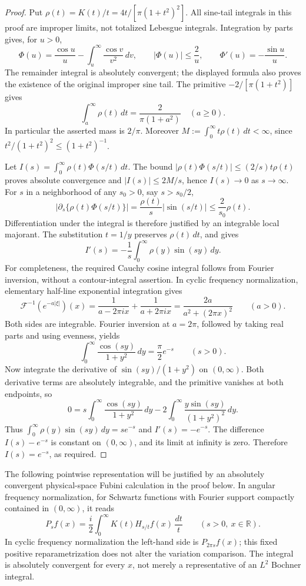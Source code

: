 \documentclass[11pt]{article}
\numberwithin{equation}{section}
\theoremstyle{remark}
\theoremstyle{definition}
\begin{document}
\begin{proof}
Put $\rho(t)=K(t)/t=4t/[\pi(1+t^2)^2]$.  All sine-tail integrals
in this proof are improper limits, not totalized Lebesgue integrals.
Integration by parts gives, for $u>0$,
\[
 \Phi(u)=\frac{\cos u}{u}-\int_u^\infty\frac{\cos v}{v^2}\,dv,
 \qquad |\Phi(u)|\le\frac2u,
 \qquad \Phi'(u)=-\frac{\sin u}{u}.
\]
The remainder integral is absolutely convergent; the displayed formula
also proves the existence of the original improper sine tail.  The
primitive $-2/[\pi(1+t^2)]$ gives
\[
 \int_a^\infty\rho(t)\,dt=\frac{2}{\pi(1+a^2)}\quad(a\ge0).
\]
In particular the asserted mass is $2/\pi$.  Moreover
$M:=\int_0^\infty t\rho(t)\,dt<\infty$, since
$t^2/(1+t^2)^2\le(1+t^2)^{-1}$.

Let $I(s)=\int_0^\infty\rho(t)\Phi(s/t)\,dt$.  The bound
$|\rho(t)\Phi(s/t)|\le(2/s)t\rho(t)$ proves absolute convergence and
$|I(s)|\le2M/s$, hence $I(s)\to0$ as $s\to\infty$.
For $s$ in a neighborhood of any $s_0>0$, say $s>s_0/2$,
\[
 \left|\partial_s\{\rho(t)\Phi(s/t)\}\right|
 =\frac{\rho(t)}s|\sin(s/t)|\le\frac{2}{s_0}\rho(t).
\]
Differentiation under the integral is therefore justified by an
integrable local majorant.  The substitution $t=1/y$ preserves
$\rho(t)\,dt$, and gives
\[
 I'(s)=-\frac1s\int_0^\infty\rho(y)\sin(sy)\,dy.
\]
For completeness, the required Cauchy cosine integral follows from
Fourier inversion, without a contour-integral assertion.  In cyclic
frequency normalization, elementary half-line exponential integration
gives
\[
 \mathcal F^{-1}(e^{-a|\xi|})(x)
 =\frac1{a-2\pi ix}+\frac1{a+2\pi ix}
 =\frac{2a}{a^2+(2\pi x)^2}\qquad(a>0).
\]
Both sides are integrable.  Fourier inversion at $a=2\pi$, followed
by taking real parts and using evenness, yields
\[
 \int_0^\infty\frac{\cos(sy)}{1+y^2}\,dy=\frac\pi2e^{-s}
 \qquad(s>0).
\]
Now integrate the derivative of $\sin(sy)/(1+y^2)$ on $(0,\infty)$.
Both derivative terms are absolutely integrable, and the primitive
vanishes at both endpoints, so
\[
 0=s\int_0^\infty\frac{\cos(sy)}{1+y^2}\,dy
   -2\int_0^\infty\frac{y\sin(sy)}{(1+y^2)^2}\,dy.
\]
Thus $\int_0^\infty\rho(y)\sin(sy)\,dy=se^{-s}$ and
$I'(s)=-e^{-s}$.  The difference $I(s)-e^{-s}$ is constant on
$(0,\infty)$, and its limit at infinity is zero.  Therefore
$I(s)=e^{-s}$, as required.
\end{proof}

The following pointwise representation will be justified by an
absolutely convergent physical-space Fubini calculation in the proof
below.  In angular frequency normalization, for Schwartz functions
with Fourier support compactly contained in $(0,\infty)$, it reads
\begin{equation}\label{eq:poisson-hilbert-representation}
 P_sf(x)=\frac i2\int_0^\infty K(t)H_{s/t}f(x)\,\frac{dt}{t}
 \qquad(s>0,\ x\in\mathbb R).
\end{equation}
In cyclic frequency normalization the left-hand side is $P_{2\pi s}f(x)$;
this fixed positive reparametrization does not alter the variation
comparison.  The integral is absolutely convergent for every $x$, not
merely a representative of an $L^2$ Bochner integral.
\end{document}
